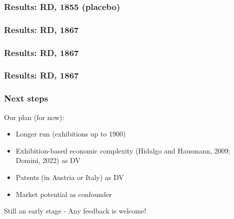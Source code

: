\documentclass[10pt]{beamer}
\begin{document}
\begin{frame}
    \frametitle{Results: RD, 1855 (placebo)}

    \centering
    \begin{minipage}{.75\textwidth}
        
    \end{minipage}
    
\end{frame}

\begin{frame}
    \frametitle{Results: RD, 1867}

    \centering
    \begin{minipage}{.75\textwidth}
        
%        
    \end{minipage}
    
\end{frame}

\begin{frame}
    \frametitle{Results: RD, 1867}

    \centering
    \begin{minipage}{.75\textwidth}
        
%        
    \end{minipage}
    
\end{frame}

\begin{frame}
    \frametitle{Results: RD, 1867}

    \centering
    \begin{minipage}{.75\textwidth}
        
%        
    \end{minipage}
    
\end{frame}

\begin{frame}
    \frametitle{Next steps}

    Our plan (for now):
    \begin{itemize}
        \item Longer run (exhibitions up to 1900)
        \item Exhibition-based economic complexity (Hidalgo and Hausmann, 2009; Domini, 2022) as DV
        \item Patents (in Austria or Italy) as DV
        \item Market potential as confounder
    \end{itemize}
  
    \bigskip
    
    Still an early stage - Any feedback is welcome!

\end{frame}
\end{document}
